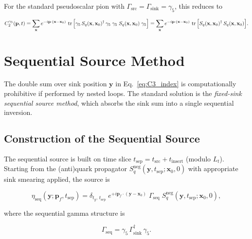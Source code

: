 \documentclass[11pt,a4paper]{article}
\newcommand{\gfive}{\gamma_5}
\newcommand{\gsrc}{\Gamma_{\text{src}}}
\newcommand{\gsink}{\Gamma_{\text{sink}}}
\newcommand{\gseq}{\Gamma_{\text{seq}}}
\newcommand{\Sq}{S_{q}}
\newcommand{\etaseq}{\eta_{\text{seq}}}
\begin{document}
For the standard pseudoscalar pion with \(\gsrc = \gsink = \gfive\), this
reduces to

\begin{equation}
C_2^{\gfive}(\mathbf{p}, t)
  = \sum_{\mathbf{x}}
    e^{-i\mathbf{p}\cdot(\mathbf{x}-\mathbf{x}_0)} \,
    \tr\Big[
      \gfive \, \Sq(\mathbf{x}, \mathbf{x}_0)^\dagger \, \gfive \;
      \gfive \;
      \Sq(\mathbf{x}, \mathbf{x}_0) \;
      \gfive
    \Big]
  = \sum_{\mathbf{x}}
    e^{-i\mathbf{p}\cdot(\mathbf{x}-\mathbf{x}_0)} \,
    \tr\Big[ \Sq(\mathbf{x}, \mathbf{x}_0)^\dagger \, \Sq(\mathbf{x}, \mathbf{x}_0) \Big] .
\label{eq:C2_g5}
\end{equation}


\section{Sequential Source Method}

The double sum over sink position \(\mathbf{y}\) in
Eq.~\eqref{eq:C3_index} is computationally prohibitive if performed by nested
loops.  The standard solution is the \emph{fixed-sink sequential source method},
which absorbs the sink sum into a single sequential inversion.

\subsection{Construction of the Sequential Source}

The sequential source is built on time slice \(t_{\text{sep}} = t_{\text{src}} +
t_{\text{insert}}\) (modulo \(L_t\)).  Starting from the (anti)quark propagator
\(\Sq^{\text{neg}}(\mathbf{y}, t_{\text{sep}}; \mathbf{x}_0, 0)\) with
appropriate sink smearing applied, the source is

\begin{equation}
\etaseq(\mathbf{y}; \mathbf{p}_f, t_{\text{sep}})
  = \delta_{t_y,\,t_{\text{sep}}} \;
    e^{+i\mathbf{p}_f\cdot(\mathbf{y}-\mathbf{x}_0)} \;
    \gseq \;
    \Sq^{\text{neg}}(\mathbf{y}, t_{\text{sep}}; \mathbf{x}_0, 0) ,
\label{eq:etaseq}
\end{equation}

where the sequential gamma structure is

\begin{equation}
\gseq = \gfive \, \gsink^\dagger \, \gfive .
\label{eq:gseq}
\end{equation}
\end{document}
